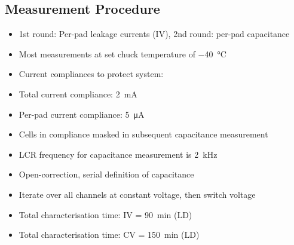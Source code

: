 \subsection{Measurement Procedure}
\label{subsec:setup_procedure}
\begin{itemize}
	\item 1st round: Per-pad leakage currents (IV), 2nd round: per-pad capacitance
	\item Most measurements at set chuck temperature of \SI{-40}{\celsius}
	\item Current compliances to protect system:
	\item Total current compliance: \SI{2}{\milli\ampere}
	\item Per-pad current compliance: \SI{5}{\micro\ampere}
	\item Cells in compliance masked in subsequent capacitance measurement
	\item LCR frequency for capacitance measurement is \SI{2}{\kilo\hertz}
	\item Open-correction, serial definition of capacitance
	\item Iterate over all channels at constant voltage, then switch voltage
	\item Total characterisation time: IV = \SI{90}{\minute} (LD)
	\item Total characterisation time: CV = \SI{150}{\minute} (LD)

\end{itemize}